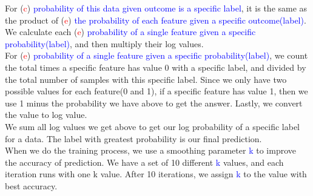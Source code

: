 \documentclass[11pt]{article}
\begin{document}
			\flushleft{}For (\textcolor{red}{c}) \textcolor{blue}{probability of this data given outcome is a specific label}, it is the same as the product of (\textcolor{red}{e}) \textcolor{blue}{the probability of each feature given a specific outcome(label)}. We calculate each (\textcolor{red}{e}) \textcolor{blue}{probability of a single feature given a specific probability(label)}, and then multiply their log values.\\
			
			\flushleft{}For (\textcolor{red}{e}) \textcolor{blue}{probability of a single feature given a specific probability(label)},  we count the total times a specific feature has value 0 with a specific label, and divided by the total number of samples with this specific label. Since we only have two possible values for each feature(0 and 1), if a specific feature has value 1, then we use 1 minus the probability we have above to get the answer. Lastly, we convert the value to log value.\\
			
			\flushleft{}{}We sum all log values we get above to get our log probability of a specific label for a data. The label with greatest probability is our final prediction.\\
			
			\flushleft{}When we do the training process, we use a smoothing parameter \textcolor{blue}{k} to improve the accuracy of prediction. We have a set of 10 different \textcolor{blue}{k} values, and each iteration runs with one k value. After 10 iterations, we assign \textcolor{blue}{k} to the value with best accuracy.
		
\end{document}
